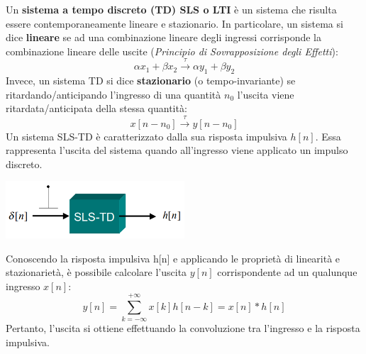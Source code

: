 Un \textbf{sistema a tempo discreto (TD) SLS o LTI} è un sistema che risulta essere contemporaneamente lineare e stazionario. In particolare, un sistema si dice \textbf{lineare} se ad una combinazione lineare degli ingressi corrisponde la combinazione lineare delle uscite (\textit{Principio di Sovrapposizione degli Effetti}):
\begin{equation}
    \alpha x_1 + \beta x_2 \overset{\tau}{\longrightarrow} \alpha y_1 + \beta y_2
\end{equation}
Invece, un sistema TD si dice \textbf{stazionario} (o tempo-invariante) se ritardando/anticipando l'ingresso di una quantità $n_0$ l'uscita viene ritardata/anticipata della stessa quantità:
\begin{equation}
    x[n-n_0] \overset{\tau}{\longrightarrow} y[n-n_0]
\end{equation}
Un sistema SLS-TD è caratterizzato dalla sua risposta impulsiva $h[n]$. Essa rappresenta l'uscita del sistema quando all'ingresso viene applicato un impulso discreto. 
\begin{center}
    \includegraphics[width=0.5\textwidth]{introduction/rispostaimpulsiva.png}
\end{center}
Conoscendo la risposta impulsiva h[n] e applicando le proprietà di linearità e stazionarietà, è possibile calcolare l'uscita $y[n]$ corrispondente ad un qualunque ingresso $x[n]$:
\begin{equation}
    y[n] = \sum_{k=-\infty}^{+\infty} x[k] h[n-k] = x[n] \ast h[n]
\end{equation}
Pertanto, l'uscita si ottiene effettuando la convoluzione tra l'ingresso e la risposta impulsiva.
